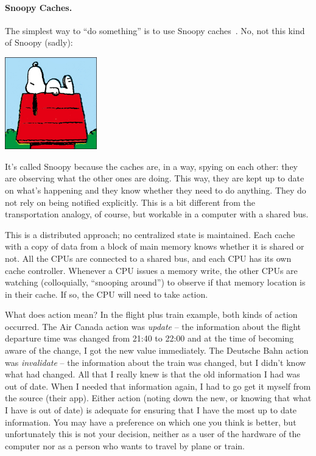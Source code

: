 \paragraph{Snoopy Caches.} The simplest way to ``do something''
is to use Snoopy caches~\cite{snoopycache}. No, not this kind of Snoopy (sadly):

\begin{center}
	\includegraphics[width=0.3\textwidth]{images/peanuts-snoopy1.jpg}
\end{center}

It's called Snoopy because the caches are, in a way, spying on each other: they are observing what the other ones are doing. This way, they are kept up to date on what's happening and they know whether they need to do anything. They do not rely on being notified explicitly. This is a bit different from the transportation analogy, of course, but workable in a computer with a shared bus.

This is a distributed approach; no centralized state is maintained. Each cache with a copy of data from a block of main memory knows whether it is shared or not. All the CPUs are connected to a shared bus, and each CPU has its own cache controller. Whenever a CPU issues a memory write, the other CPUs are watching (colloquially, ``snooping around'') to observe if that memory location is in their cache. If so, the CPU will need to take action.

What does action mean? In the flight plus train example, both kinds of action occurred. The Air Canada action was \textit{update} -- the information about the flight departure time was changed from 21:40 to 22:00 and at the time of becoming aware of the change, I got the new value immediately. The Deutsche Bahn action was \textit{invalidate} -- the information about the train was changed, but I didn't know what had changed. All that I really knew is that the old information I had was out of date. When I needed that information again, I had to go get it myself from the source (their app). Either action (noting down the new, or knowing that what I have is out of date) is adequate for ensuring that I have the most up to date information. You may have a preference on which one you think is better, but unfortunately this is not your decision, neither as a user of the hardware of the computer nor as  a person who wants to travel by plane or train.

